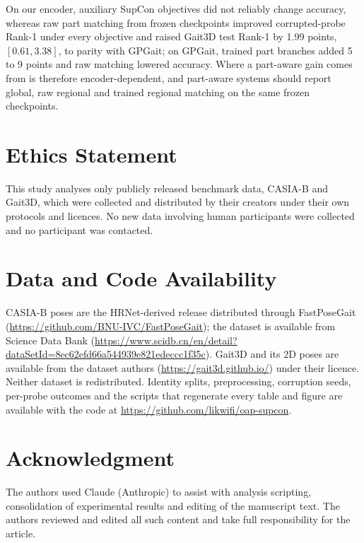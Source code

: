 \documentclass[journal]{IEEEtran}
\begin{document}
On our encoder, auxiliary SupCon objectives did not reliably change accuracy,
whereas raw part matching from frozen checkpoints improved corrupted-probe
Rank-1 under every objective and raised Gait3D test Rank-1 by 1.99 points,
$[0.61,3.38]$, to parity with GPGait; on GPGait, trained part branches added 5 to
9 points and raw matching lowered accuracy. Where a part-aware gain comes from
is therefore encoder-dependent, and part-aware systems should report global,
raw regional and trained regional matching on the same frozen checkpoints.


\section*{Ethics Statement}
This study analyses only publicly released benchmark data, CASIA-B and Gait3D,
which were collected and distributed by their creators under their own
protocols and licences. No new data involving human participants were collected
and no participant was contacted.

\section*{Data and Code Availability}
CASIA-B poses are the HRNet-derived release distributed through FastPoseGait
(\url{https://github.com/BNU-IVC/FastPoseGait}); the dataset is available from
Science Data Bank
(\url{https://www.scidb.cn/en/detail?dataSetId=8ec62efd66a544939e821edeccc1f35c}).
Gait3D and its 2D poses are available from the dataset authors
(\url{https://gait3d.github.io/}) under their licence. Neither dataset is
redistributed. Identity splits, preprocessing, corruption seeds, per-probe
outcomes and the scripts that regenerate every table and figure are available
with the code at \url{https://github.com/likwifi/oap-supcon}.

\section*{Acknowledgment}
The authors used Claude (Anthropic) to assist with analysis scripting,
consolidation of experimental results and editing of the manuscript text. The
authors reviewed and edited all such content and take full responsibility for
the article.
\end{document}

